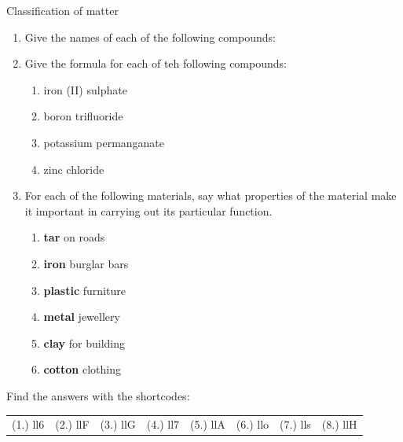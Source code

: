 \begin{eocexercises}{Classification of matter }
{\begin{enumerate}[noitemsep, label=\textbf{\arabic*}. ]
\begin{enumerate}[noitemsep, label=\textbf{\alph*}. ]
\end{enumerate}
\label{m38706*uid153}\item Give the names of each of the following compounds:
\label{m38706*id68358}\begin{enumerate}[noitemsep, label=\textbf{\alph*}. ] 
            \label{m38706*uid154}\item $\mathsf{NaBr}$
\label{m38706*uid155}\item ${\mathsf{Ba}(\mathsf{NO}}}_{2})_2$
\label{m38706*uid156}\item ${\mathsf{SO}}_{2}$ 
\item $\mathsf{H}_{2}\mathsf{SO}_{4}$
\end{enumerate}
\item Give the formula for each of teh following compounds:
\begin{enumerate}[noitemsep, label=\textbf{\alph*}.]
 \item iron (II) sulphate
\item boron trifluoride
\item potassium permanganate
\item zinc chloride
\end{enumerate}

\label{m38706*uid157}\item For each of the following materials, say what properties of the material make it important in carrying out its particular function.
\label{m38706*id68436}\begin{enumerate}[noitemsep, label=\textbf{\alph*}. ] 
            \label{m38706*uid158}\item \textbf{tar} on roads
\label{m38706*uid159}\item \textbf{iron} burglar bars
\label{m38706*uid160}\item \textbf{plastic} furniture
\label{m38706*uid161}\item \textbf{metal} jewellery
\label{m38706*uid162}\item \textbf{clay} for building
\label{m38706*uid163}\item \textbf{cotton} clothing
\end{enumerate}
\end{enumerate}
  \label{m38706**end}
  \label{09a7a4809656be0b739ee130746cd803**end}
\par {} Find the answers with the shortcodes:
 \par \begin{tabular}[h]{cccccc}
 (1.) ll6  &  (2.) llF  &  (3.) llG  &  (4.) ll7  &  (5.) llA  &  (6.) llo  &  (7.) lls  &  (8.) llH  & \end{tabular}}
\end{eocexercises}
